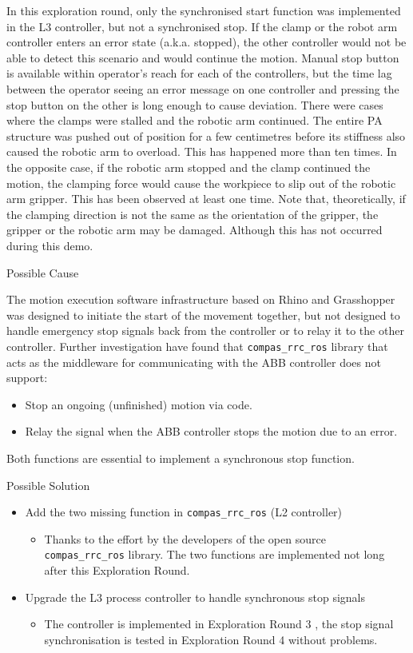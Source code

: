 In this exploration round, only the synchronised start function was implemented in the L3 controller, but not a synchronised stop. If the clamp or the robot arm controller enters an error state (a.k.a. stopped), the other controller would not be able to detect this scenario and would continue the motion. Manual stop button is available within operator’s reach for each of the controllers, but the time lag between the operator seeing an error message on one controller and pressing the stop button on the other is long enough to cause deviation.
There were cases where the clamps were stalled and the robotic arm continued. The entire PA structure was pushed out of position for a few centimetres before its stiffness also caused the robotic arm to overload. This has happened more than ten times.
In the opposite case, if the robotic arm stopped and the clamp continued the motion, the clamping force would cause the workpiece to slip out of the robotic arm gripper. This has been observed at least one time.
Note that, theoretically, if the clamping direction is not the same as the orientation of the gripper, the gripper or the robotic arm may be damaged. Although this has not occurred during this demo.

Possible Cause

The motion execution software infrastructure based on Rhino and Grasshopper was designed to initiate the start of the movement together, but not designed to handle emergency stop signals back from the controller or to relay it to the other controller.
Further investigation have found that \verb|compas_rrc_ros| library that acts as the middleware for communicating with the ABB controller does not support:
\begin{itemize}
    \item Stop an ongoing (unfinished) motion via code.
    \item Relay the signal when the ABB controller stops the motion due to an error. 
\end{itemize}

Both functions are essential to implement a synchronous stop function.

Possible Solution

\begin{itemize}
    \item Add the two missing function in \verb|compas_rrc_ros| (L2 controller)
    \begin{itemize}
        \item Thanks to the effort by the developers of the open source \verb|compas_rrc_ros| library. The two functions are implemented not long after this Exploration Round. 
    \end{itemize}
    \item Upgrade the L3 process controller to handle synchronous stop signals
    \begin{itemize}
        \item The controller is implemented in Exploration Round 3 , the stop signal synchronisation is tested in Exploration Round 4 without problems.
    \end{itemize}
\end{itemize}

